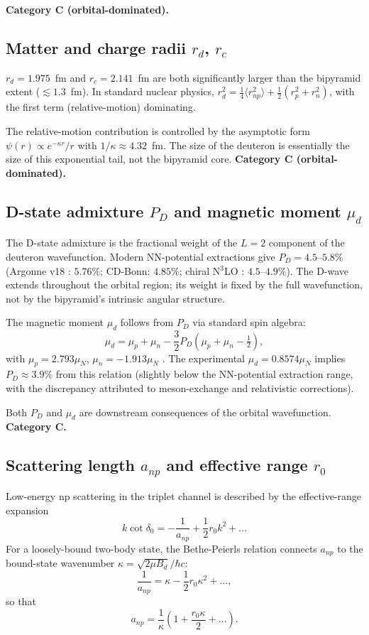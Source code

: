 \documentclass[11pt,letterpaper]{article}
\newcommand{\Bd}{B_{d}}
\newcommand{\PD}{P_{D}}
\newcommand{\mud}{\mu_{d}}
\newcommand{\anp}{a_{np}}
\newcommand{\rzero}{r_{0}}
\begin{document}
\textbf{Category C (orbital-dominated).}

\subsection{Matter and charge radii $r_d$, $r_c$}

$r_d = 1.975$~fm and $r_c = 2.141$~fm are both significantly larger than the bipyramid extent ($\lesssim 1.3$~fm). In standard nuclear physics, $r_d^2 = \frac{1}{4}\langle r_{np}^2 \rangle + \frac{1}{2}(r_p^2 + r_n^2)$, with the first term (relative-motion) dominating.

The relative-motion contribution is controlled by the asymptotic form $\psi(r) \propto e^{-\kappa r}/r$ with $1/\kappa \approx 4.32$~fm. The size of the deuteron is essentially the size of this exponential tail, not the bipyramid core. \textbf{Category C (orbital-dominated).}

\subsection{D-state admixture $\PD$ and magnetic moment $\mud$}

The D-state admixture is the fractional weight of the $L=2$ component of the deuteron wavefunction. Modern NN-potential extractions give $\PD = 4.5$--$5.8\%$ (Argonne v18 \cite{argonne_v18}: $5.76\%$; CD-Bonn: $4.85\%$; chiral N$^3$LO \cite{machleidt_entem}: $4.5$--$4.9\%$). The D-wave extends throughout the orbital region; its weight is fixed by the full wavefunction, not by the bipyramid's intrinsic angular structure.

The magnetic moment $\mud$ follows from $\PD$ via standard spin algebra:
\[
\mud = \mu_p + \mu_n - \frac{3}{2} \PD (\mu_p + \mu_n - \tfrac{1}{2}),
\]
with $\mu_p = 2.793 \mu_N$, $\mu_n = -1.913 \mu_N$ \cite{pdg2024}. The experimental $\mud = 0.8574 \mu_N$ implies $\PD \approx 3.9\%$ from this relation (slightly below the NN-potential extraction range, with the discrepancy attributed to meson-exchange and relativistic corrections).

Both $\PD$ and $\mud$ are downstream consequences of the orbital wavefunction. \textbf{Category C.}

\subsection{Scattering length $\anp$ and effective range $\rzero$}
\label{sec:anp_r0}

Low-energy np scattering in the triplet channel is described by the effective-range expansion
\[
k \cot \delta_0 = -\frac{1}{\anp} + \frac{1}{2} \rzero k^2 + \ldots
\]
For a loosely-bound two-body state, the Bethe-Peierls relation connects $\anp$ to the bound-state wavenumber $\kappa = \sqrt{2\mu\Bd}/\hbar c$:
\[
\frac{1}{\anp} = \kappa - \frac{1}{2}\rzero \kappa^2 + \ldots,
\]
so that
\[
\anp = \frac{1}{\kappa}\left(1 + \frac{\rzero \kappa}{2} + \ldots\right).
\]
\end{document}
